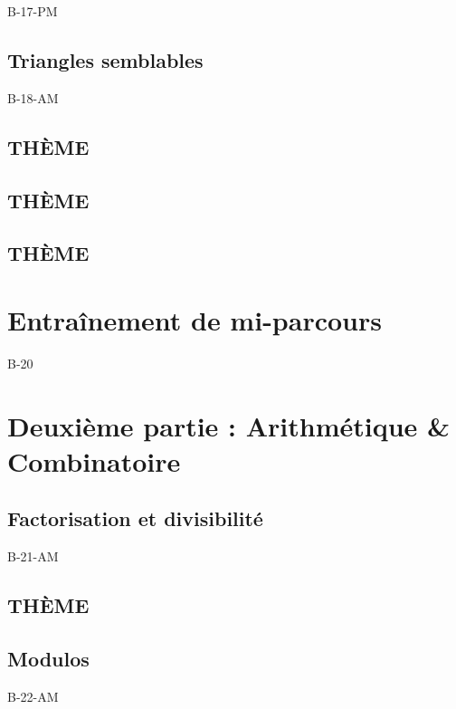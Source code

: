 \documentclass[poly,trombi]{valbonne}
\begin{document}
{B-17-PM}

\subsection{Triangles semblables}

{B-18-AM}

\subsection{THÈME}


\subsection{THÈME}


\subsection{THÈME}



\section{Entraînement de mi-parcours}

{B-20}


\section{Deuxième partie : Arithmétique \& Combinatoire}

\subsection{Factorisation et divisibilité}

{B-21-AM}

\subsection{THÈME}


\subsection{Modulos}
{B-22-AM}
\end{document}
